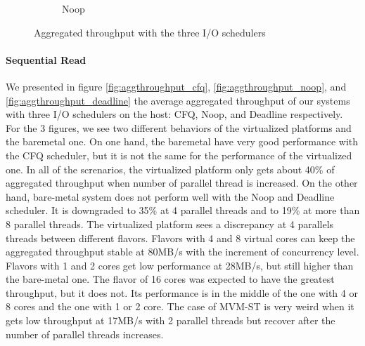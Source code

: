 \documentclass{acmsig}
\begin{document}
\begin{figure}[t]
\begin{subfigure}[b]{0.3\textwidth}
     \caption{Noop}
     \label{fig:aggthroughput_noop_write}
   \end{subfigure}
   \caption{Aggregated throughput with the three I/O schedulers}\label{fig:aggthroughput}
\end{figure}

\paragraph{Sequential Read}
We presented in figure \ref{fig:aggthroughput_cfq}, \ref{fig:aggthroughput_noop}, and \ref{fig:aggthroughput_deadline} the average aggregated throughput of our systems with three I/O schedulers on the host: CFQ, Noop, and Deadline respectively. For the 3 figures, we see two different behaviors of the virtualized platforms and the baremetal one. On one hand, the baremetal have very good performance with the CFQ scheduler, but it is not the same for the performance of the virtualized one. In all of the screnarios, the virtualized platform only gets about 40\% of aggregated throughput when number of parallel thread is increased. On the other hand, bare-metal system does not perform well with the Noop and Deadline scheduler. It is downgraded to 35\% at 4 parallel threads and to 19\% at more than 8 parallel threads. The virtualized platform sees a discrepancy at 4 parallels threads between different flavors. Flavors with 4 and 8 virtual cores can keep the aggregated throughput stable at 80MB/s with the increment of concurrency level. Flavors with 1 and 2 cores get low performance at 28MB/s, but still higher than the bare-metal one. The flavor of 16 cores was expected to have the greatest throughput, but it does not. Its performance is in the middle of the one with 4 or 8 cores and the one with 1 or 2 core. The case of MVM-ST is very weird when it gets low throughput at 17MB/s with 2 parallel threads but recover after the number of parallel threads increases.
\end{document}
